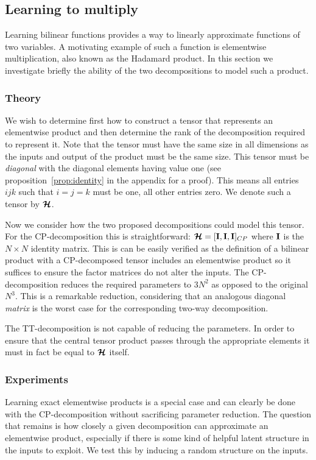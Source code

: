 {\subsection{Learning to multiply}
Learning bilinear functions provides a way to linearly approximate functions of two variables.
A motivating example of such a function is elementwise multiplication, also known as the Hadamard
product. In this section we investigate briefly the ability of the two decompositions to model
such a product.

\subsubsection{Theory}
We wish to determine first how to construct a tensor that represents an elementwise product and
then determine the rank of the decomposition required to represent it. Note that the tensor must
have the same size in all dimensions as the inputs and
 output of the product must be the same size. This tensor must be \textit{diagonal} with the
 diagonal elements having value one
 (see proposition~\ref{prop:identity} in the appendix for a proof). This means all entries
\(ijk\) such that \(i = j = k\) must be one, all other entries zero. We denote such a tensor
by \(\bm{\mathcal{H}}\).

Now we consider how the two proposed decompositions could model this tensor. For the 
CP-decomposition this is straightforward:
\(\bm{\mathcal{H}} = [\mathbf{I}, \mathbf{I}, \mathbf{I}]_{CP}\) where \(\mathbf{I}\) is the 
\(N\times N\) identity matrix. This is can be easily verified as the definition of a bilinear
product with a CP-decomposed tensor includes an elementwise product so it suffices to ensure the
factor matrices do not alter the inputs. The CP-decomposition reduces the required parameters
to \(3N^2\) as opposed to the original \(N^3\). This is a remarkable reduction, considering that
an analogous diagonal \emph{matrix} is the worst case for the corresponding two-way 
decomposition. 

The TT-decomposition is not capable of reducing the parameters. In order to ensure that the
central tensor product passes through the appropriate elements it must in
fact be equal to \(\bm{\mathcal{H}}\) itself.

\subsubsection{Experiments}
Learning exact elementwise products is a special case and can clearly be done with the 
CP-decomposition without sacrificing parameter reduction. The question that remains is how closely
a given decomposition can approximate an elementwise product, especially if there is some kind of
helpful latent structure in the inputs to exploit. We test this by inducing a random structure
on the inputs.

}
